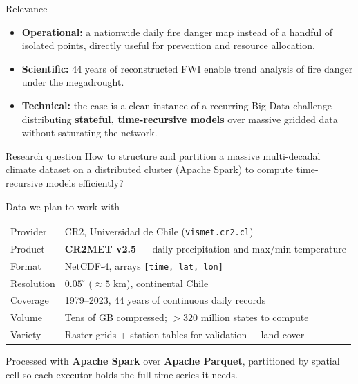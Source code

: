 \documentclass[11pt,aspectratio=169]{beamer}
\begin{document}
\begin{frame}{Relevance}
  \begin{itemize}
    \item \textbf{Operational:} a nationwide daily fire danger map instead of a handful of isolated points,
          directly useful for prevention and resource allocation.
    \item \textbf{Scientific:} 44 years of reconstructed FWI enable trend analysis of fire danger
          under the megadrought.
    \item \textbf{Technical:} the case is a clean instance of a recurring Big Data challenge ---
          distributing \textbf{stateful, time-recursive models} over massive gridded data without
          saturating the network.
  \end{itemize}
  \vfill
  \begin{alertblock}{Research question}
    How to structure and partition a massive multi-decadal climate dataset on a distributed cluster
    (Apache Spark) to compute time-recursive models efficiently?
  \end{alertblock}
\end{frame}

\begin{frame}{Data we plan to work with}
  \begin{table}
    \centering
    \small
    \begin{tabular}{ll}
      \toprule
      Provider   & CR2, Universidad de Chile (\texttt{vismet.cr2.cl}) \\
      Product    & \textbf{CR2MET v2.5} --- daily precipitation and max/min temperature \\
      Format     & NetCDF-4, arrays \texttt{[time, lat, lon]} \\
      Resolution & $0.05^\circ$ ($\approx 5$ km), continental Chile \\
      Coverage   & 1979--2023, 44 years of continuous daily records \\
      Volume     & Tens of GB compressed; $>320$ million states to compute \\
      Variety    & Raster grids + station tables for validation + land cover \\
      \bottomrule
    \end{tabular}
  \end{table}
  \vfill
  Processed with \textbf{Apache Spark} over \textbf{Apache Parquet}, partitioned by spatial cell so each
  executor holds the full time series it needs.
  \vfill
  \centering

\end{frame}
\end{document}
